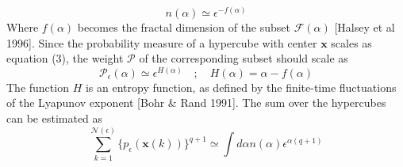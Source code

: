 \begin{equation}
    n(\alpha)\simeq\epsilon^{-f(\alpha)}
\end{equation}
Where $f(\alpha)$ becomes the fractal dimension of the subset $\mathcal{F}(\alpha)$ [Halsey et al 1996]. 
Since the probability measure of a hypercube with center $\mathbf{x}$ scales as equation (3), the weight $\mathcal{P}$ of the corresponding subset should scale as
\begin{equation}
    \mathcal{P}_\epsilon(\alpha)\simeq\epsilon^{H(\alpha)}\quad;\quad H(\alpha)=\alpha-f(\alpha)
\end{equation}
The function $H$ is an entropy function, as defined by the finite-time fluctuations of the Lyapunov exponent [Bohr \& Rand 1991]. The sum over the hypercubes can be estimated as
\begin{equation}
    \sum_{k=1}^{\mathcal{N}(\epsilon)}\bigg\{p_\epsilon(\mathbf{x}(k))\bigg\}^{q+1}\simeq\int d\alpha n(\alpha)\epsilon^{\alpha(q+1)}
\end{equation}


